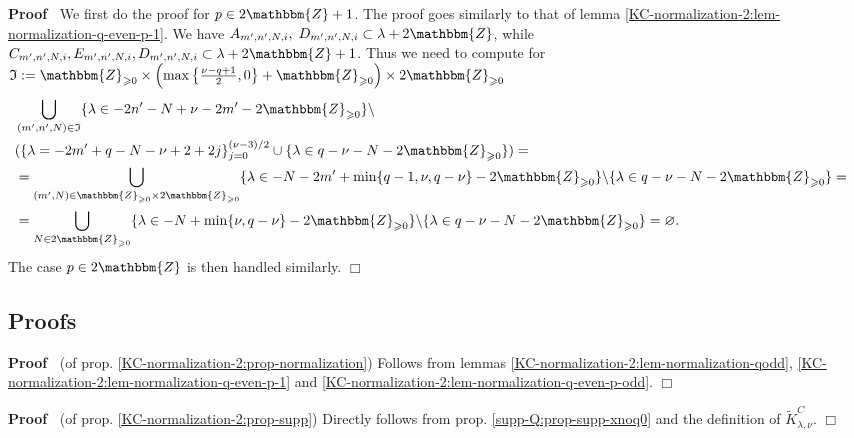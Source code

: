 \documentclass{article}
\newcommand{\assign}{:=}
\newenvironment{proof}{\noindent\textbf{Proof\ }}{\hspace*{\fill}$\Box$\medskip}
\numberwithin{definition}{section}
\numberwithin{lemma}{section}
\numberwithin{proposition}{section}
{\theorembodyfont{\rmfamily}\newtheorem{remark}{Remark}
\numberwithin{remark}{section}
}
\begin{document}
\begin{proof}
  We first do the proof for $p \in 2\mathbbm{Z}+ 1$. The proof goes similarly
  to that of lemma \ref{KC-normalization-2:lem-normalization-q-even-p-1}. We
  have $A_{m', n', N, i}, \; D_{m', n', N, i} \subset \lambda + 2\mathbbm{Z}$,
  while $C_{m', n', N, i}, E_{m', n', N, i}, D_{m', n', N, i} \subset \lambda
  + 2\mathbbm{Z}+ 1$. Thus we need to compute for $\mathfrak{I} \assign
  \mathbbm{Z}_{\geqslant 0} \times \left( \max \left\{ \frac{\nu - q + 1}{2},
  0 \right\} +\mathbbm{Z}_{\geqslant 0} \right) \times 2\mathbbm{Z}_{\geqslant
  0}$
  \begin{eqnarray}
    & \bigcup_{( m', n', N) \in \mathfrak{I}} \{ \lambda \in - 2 n' - N + \nu
    - 2 m' - 2\mathbbm{Z}_{\geqslant 0} \} \backslash &  \nonumber\\
    & ( \{ \lambda = - 2 m' + q - N - \nu + 2 + 2 j \}_{j = 0}^{( \nu - 3) /
    2} \cup \{ \lambda \in q - \nu - N - 2\mathbbm{Z}_{\geqslant 0} \}) = & 
    \nonumber\\
    & = \bigcup_{( m', N) \in \mathbbm{Z}_{\geqslant 0} \times
    2\mathbbm{Z}_{\geqslant 0}} \{ \lambda \in - N - 2 m' + \min \{ q - 1,
    \nu, q - \nu \} - 2\mathbbm{Z}_{\geqslant 0} \} \backslash \{ \lambda \in
    q - \nu - N - 2\mathbbm{Z}_{\geqslant 0} \} = &  \nonumber\\
    & = \bigcup_{N \in 2\mathbbm{Z}_{\geqslant 0}} \{ \lambda \in - N + \min
    \{ \nu, q - \nu \} - 2\mathbbm{Z}_{\geqslant 0} \} \backslash \{ \lambda
    \in q - \nu - N - 2\mathbbm{Z}_{\geqslant 0} \} = \varnothing . & 
    \nonumber
  \end{eqnarray}
  The case $p \in 2\mathbbm{Z}$ is then handled similarly.
\end{proof}

\subsection{Proofs}

\begin{proof}
  (of prop. \ref{KC-normalization-2:prop-normalization}) Follows from lemmas
  \ref{KC-normalization-2:lem-normalization-qodd},
  \ref{KC-normalization-2:lem-normalization-q-even-p-1} and
  \ref{KC-normalization-2:lem-normalization-q-even-p-odd}.
\end{proof}

\begin{proof}
  (of prop. \ref{KC-normalization-2:prop-supp}) Directly follows from prop.
  \ref{supp-Q:prop-supp-xnoq0} and the definition of $\tilde{K}_{\lambda,
  \nu}^C$.
\end{proof}
\end{document}
